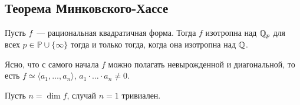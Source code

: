 	


	\subsection{Теорема Минковского-Хассе}

	\begin{theorem}\label{MinkHasse} 
		Пусть $f$~--- рациональная квадратичная форма. Тогда $f$ изотропна над $\mathbb{Q}_{p}$ для всех  $p \in \mathbb{P} \cup \{ \infty \}$ тогда и только тогда, когда она изотропна над $\mathbb{Q}$.
	\end{theorem}

	\begin{remark}
		Ясно, что с самого начала $f$ можно полагать невырожденной и диагональной, то есть $f \simeq \langle a_1, \ldots, a_n \rangle$, $a_1 \cdot \ldots \cdot a_n \neq 0$.
	\end{remark}

	Пусть $n = \dim{f}$, случай $n = 1$ тривиален. 

